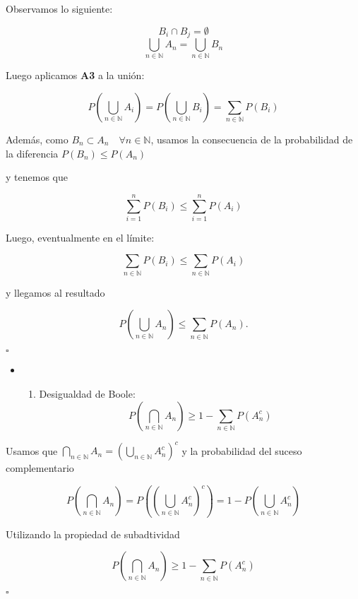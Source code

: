 Observamos lo siguiente:

\[B_i \cap B_j = \emptyset\]
\[\bigcup_{n \in \mathbb{N}} A_n = \bigcup_{n \in \mathbb{N}} B_n \]

Luego aplicamos \textbf{A3} a la unión:

\[
P\left(\bigcup_{n \in \mathbb{N}} A_i \right) = P\left(\bigcup_{n \in \mathbb{N}} B_i \right) = \sum_{n \in \mathbb{N}} P(B_i)
\]

Además, como \(B_n \subset A_n \quad \forall n \in \mathbb{N}\), usamos
la consecuencia de la probabilidad de la diferencia
\(P(B_n) \leq P(A_n)\)

y tenemos que

\[
\sum_{i=1}^n P(B_i) \leq \sum_{i=1}^n P(A_i)
\]

Luego, eventualmente en el límite:

\[
\sum_{n \in \mathbb{N}} P(B_i) \leq \sum_{n \in \mathbb{N}} P(A_i)
\]

y llegamos al resultado

\[
P\left(\bigcup_{n \in \mathbb{N}} A_n\right) \leq \sum_{n \in \mathbb{N}} P(A_n).
\]

\(\square\)

\begin{itemize}
\item
  \begin{enumerate}
  \def\labelenumi{\alph{enumi})}
  \setcounter{enumi}{7}
  \tightlist
  \item
    Desigualdad de Boole: \[
    P\left(\bigcap_{n \in \mathbb{N}} A_n \right) \geq 1 − \sum_{n \in \mathbb{N}} P(A_n^c)
    \]
  \end{enumerate}
\end{itemize}

Usamos que
\(\bigcap_{n \in \mathbb{N}} A_n = \left(\bigcup_{n \in \mathbb{N}} A_n^c \right)^c\)
y la probabilidad del suceso complementario

\[
P\left( \bigcap_{n \in \mathbb{N}}A_n \right) = 
P\left( \left(\bigcup_{n \in \mathbb{N}} A_n^c \right)^c \right) = 
1 - P\left( \bigcup_{n \in \mathbb{N}}A_n^c \right)
\]

Utilizando la propiedad de subadtividad

\[
  P\left(\bigcap_{n \in \mathbb{N}} A_n \right) \geq 1 − \sum_{n \in \mathbb{N}} P(A_n^c)
\]

\(\square\)
